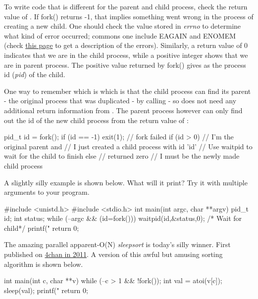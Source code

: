 To write code that is different for the parent and child process, check the return value of . If fork() returns -1, that implies something went wrong in the process of creating a new child. One should check the value stored in \emph{errno} to determine what kind of error occurred; commons one include EAGAIN and ENOMEM (check \href{http://www-numi.fnal.gov/offline_software/srt_public_context/WebDocs/Errors/unix_system_errors.html}{this page} to get a description of the errors). Similarly, a return value of 0 indicates that we are in the child process, while a positive integer shows that we are in parent process. The positive value returned by fork() gives as the process id (\emph{pid}) of the child.

One way to remember which is which is that the child process can find its parent - the original process that was duplicated - by calling  - so does not need any additional return information from . The parent process however can only find out the id of the new child process from the return value of :

\begin{code}[language=C]
pid_t id = fork();
if (id == -1) exit(1); // fork failed 
if (id > 0)
{ 
// I'm the original parent and 
// I just created a child process with id 'id'
// Use waitpid to wait for the child to finish
} else { // returned zero
// I must be the newly made child process
}
\end{code}

A slightly silly example is shown below. What will it print? Try it with multiple arguments to your program.

\begin{code}[language=C]
#include <unistd.h>
#include <stdio.h>
int main(int argc, char **argv) {
  pid_t id;
  int status; 
  while (--argc && (id=fork())) {
    waitpid(id,&status,0); /* Wait for child*/
  }
  printf("%
  return 0;
}
\end{code}

The amazing parallel apparent-O(N) \emph{sleepsort} is today's silly winner. First published on \href{https://dis.4chan.org/read/prog/1295544154}{4chan in 2011}. A version of this awful but amusing sorting algorithm is shown below.

\begin{code}[language=C]
int main(int c, char **v)
{
        while (--c > 1 && !fork());
        int val  = atoi(v[c]);
        sleep(val);
        printf("%
        return 0;
}
\end{code}

